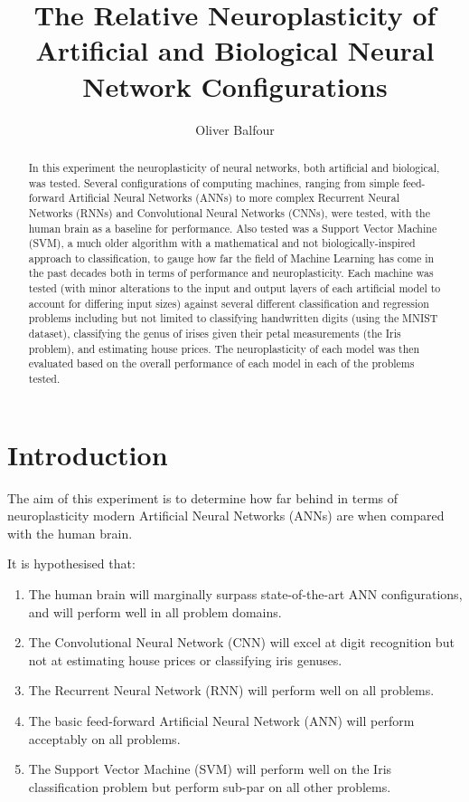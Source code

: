 \documentclass[]{report}
\title{
	The Relative Neuroplasticity of Artificial
	\linebreak
	and Biological Neural Network Configurations
}
\author{Oliver Balfour}
\begin{document}
\maketitle

\begin{abstract}
	In this experiment the neuroplasticity of neural networks, both artificial and biological, was tested. Several configurations of computing machines, ranging from simple feed-forward Artificial Neural Networks (ANNs) to more complex Recurrent Neural Networks (RNNs) and Convolutional Neural Networks (CNNs), were tested, with the human brain as a baseline for performance. Also tested was a Support Vector Machine (SVM), a much older algorithm with a mathematical and not biologically-inspired approach to classification, to gauge how far the field of Machine Learning has come in the past decades both in terms of performance and neuroplasticity. Each machine was tested (with minor alterations to the input and output layers of each artificial model to account for differing input sizes) against several different classification and regression problems including but not limited to classifying handwritten digits (using the MNIST dataset), classifying the genus of irises given their petal measurements (the Iris problem), and estimating house prices. The neuroplasticity of each model was then evaluated based on the overall performance of each model in each of the problems tested.
\end{abstract}

\tableofcontents
{}
\newpage

\section{Introduction}

The aim of this experiment is to determine how far behind in terms of neuroplasticity modern Artificial Neural Networks (ANNs) are when compared with the human brain.

It is hypothesised that:
\begin{enumerate}
	\item The human brain will marginally surpass state-of-the-art ANN configurations, and will perform well in all problem domains.
	\item The Convolutional Neural Network (CNN) will excel at digit recognition but not at estimating house prices or classifying iris genuses.
	\item The Recurrent Neural Network (RNN) will perform well on all problems.
	\item The basic feed-forward Artificial Neural Network (ANN) will perform acceptably on all problems.
	\item The Support Vector Machine (SVM) will perform well on the Iris classification problem but perform sub-par on all other problems.
\end{enumerate}
\end{document}
